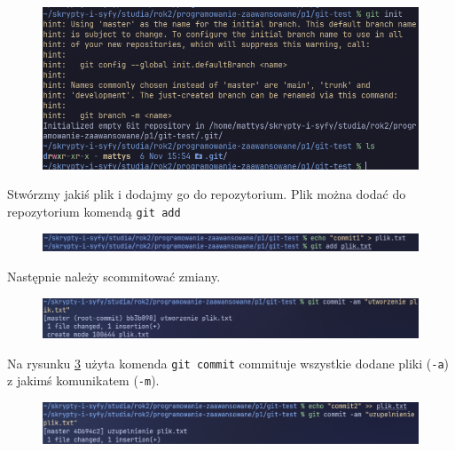 \begin{figure}[H]
	\centering
	\includegraphics[width=1\textwidth]{images/git_init.png}
	\caption{}
	\label{fig:git_init}
\end{figure}

Stwórzmy jakiś plik i dodajmy go do repozytorium. Plik można dodać do repozytorium komendą \texttt{git add}

\begin{figure}[H]
	\centering
	\includegraphics[width=1\textwidth]{images/git_add.png}
	\caption{}
	\label{fig:git_add}
\end{figure}

Następnie należy scommitować zmiany. 

\begin{figure}[H]
	\centering
	\includegraphics[width=1\textwidth]{images/git_commit1.png}
	\caption{}
	\label{fig:git_commit1}
\end{figure}

Na rysunku \ref{fig:git_commit1} użyta komenda \texttt{git commit} commituje wszystkie dodane pliki (\texttt{-a}) z jakimś komunikatem (\texttt{-m}).  

\begin{figure}[H]
	\centering
	\includegraphics[width=1\textwidth]{images/git_commit2.png}
	\caption{}
	\label{fig:git_commit2}
\end{figure}

